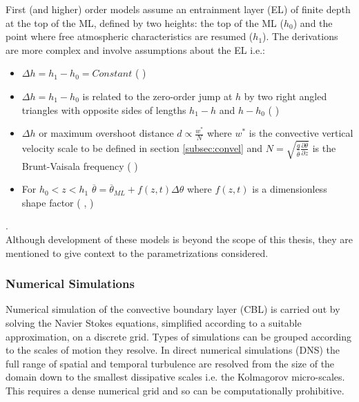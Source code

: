 First (and higher) order models assume an entrainment layer (\acs{EL}) of finite depth at the top of the ML, defined by two heights:
the top of the ML ($h_{0}$) and the point where free atmospheric characteristics are resumed ($h_{1}$).  The derivations are more complex and 
involve assumptions about the \acs{EL} i.e.: 

\begin{itemize}
\item{$\Delta h = h_{1} - h_{0} = Constant$ (\citeauthor{Betts74} \citeyear{Betts74})}

\item{$\Delta h = h_{1} - h_{0}$ is related to the zero-order jump at $h$ by two right angled triangles with opposite sides
of lengths $h_{1} - h$ and $h - h_{0}$ (\citeauthor{BatchGryn} \citeyear{BatchGryn})}

\item{$\Delta h$ or maximum overshoot distance $d \propto \frac{w^{*}}{N}$ where $w^{*}$ is the convective vertical velocity scale to be defined in section \ref{subsec:convel} and $N = \sqrt{\frac{g}{\overline{\theta}} \frac{\partial \overline{\theta}}{\partial z}}$ is the Brunt-Vaisala frequency (\citeauthor{Stull73} \citeyear{Stull73})}
 
\item{For $h_{0}<z<h_{1}$ $\overline{\theta} = \overline{\theta}_{ML} + f(z,t) \Delta \theta$ where $f(z,t)$ is a dimensionless shape factor (\citeauthor{Deardorff79} \citeyear{Deardorff79}, \citeauthor{FedConzMir04} \citeyear{FedConzMir04})}
\end{itemize}
 .\\

Although development of these models is beyond the scope of this thesis, they are mentioned to give context to the parametrizations considered. \\         

\subsubsection{Numerical Simulations}
\label{subsubsec:}

Numerical simulation of the convective boundary layer (\acs{CBL}) is carried out by solving the Navier Stokes equations, simplified according to a suitable approximation, on a discrete grid.  Types of simulations can be grouped according to the scales of motion they resolve.  In direct numerical simulations (\acs{DNS}) the full range of spatial and temporal turbulence are resolved from the size of the domain down to the smallest dissipative scales i.e. the Kolmagorov micro-scales.  This requires a dense numerical grid and so can be computationally prohibitive.\\

